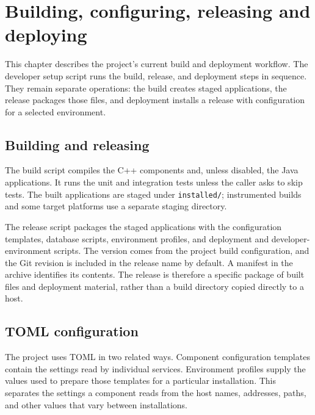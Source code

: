 \chapter{Building, configuring, releasing and deploying}
\label{ch:build_release_deployment}

This chapter describes the project's current build and deployment workflow.
The developer setup script runs the build, release, and deployment steps in
sequence. They remain separate operations: the build creates staged
applications, the release packages those files, and deployment installs a
release with configuration for a selected environment.

\section{Building and releasing}
\label{sec:build_release_deployment:build_release}

The build script compiles the C++ components and, unless disabled, the Java
applications. It runs the unit and integration tests unless the caller asks to
skip tests. The built applications are staged under \texttt{installed/};
instrumented builds and some target platforms use a separate staging
directory.

The release script packages the staged applications with the configuration
templates, database scripts, environment profiles, and deployment and
developer-environment scripts. The version comes from the project build
configuration, and the Git revision is included in the release name by
default. A manifest in the archive identifies its contents. The release is
therefore a specific package of built files and deployment material, rather
than a build directory copied directly to a host.

\section{TOML configuration}
\label{sec:build_release_deployment:toml}

The project uses TOML in two related ways. Component configuration templates
contain the settings read by individual services. Environment profiles supply
the values used to prepare those templates for a particular installation.
This separates the settings a component reads from the host names, addresses,
paths, and other values that vary between installations.

